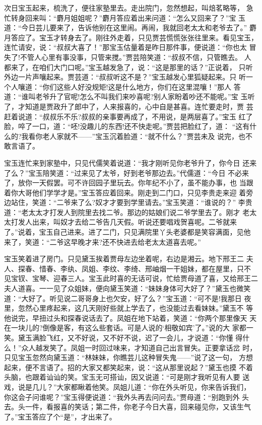 次日宝玉起来，梳洗了，便往家塾里去。走出院门，忽然想起，叫焙茗略等，
急忙转身回来叫：“麝月姐姐呢？”麝月答应着出来问道：“怎么又回来了？”宝
玉道：“今日芸儿要来了，告诉他别在这里闹。再闹，我就回老太太和老爷去了。”
麝月答应了。宝玉才转身去了。刚往外走着，只见贾芸慌慌张张往里来。看见宝玉，
连忙请安，说：“叔叔大喜了！”那宝玉估量着是昨日那件事，便说道：“你也太
冒失了!不管人心里有事没事，只管来搅。”贾芸陪笑道：“叔叔不信，只管瞧去。
人都来了，在咱们大门口呢。”宝玉越发急了，说：“这是那里的话？”正说着，
只听外边一片声嚷起来。贾芸道：“叔叔听这不是？”宝玉越发心里狐疑起来。只
听一个人嚷道：“你们这些人好没规矩!这是什么地方，你们在这里混嚷！”那人
答道：“谁叫老爷升了官呢!怎么不叫我们来吵喜呢?别人家盼着吵还不能呢。”宝
玉听了，才知道是贾政升了郎中了，人来报喜的，心中自是甚喜。连忙要走时，贾
芸赶着说道：“叔叔乐不乐?叔叔的亲事要再成了，不用说，是两层喜了。”宝玉
红了脸，啐了一口，道：“呸!没趣儿的东西!还不快走呢。”贾芸把脸红了，道：
“这有什么的?我看你老人家就不——”宝玉沉着脸道：“就不什么？”贾芸未及
说完，也不敢言语了。

宝玉连忙来到家塾中，只见代儒笑着说道：“我才刚听见你老爷升了，你今日
还来了么？”宝玉陪笑道：“过来见了太爷，好到老爷那边去。”代儒道：“今日
不必来了，放你一天假罢。可不许回园子里玩去。你年纪不小了，虽不能办事，也
当跟着你大哥他们学学才是。”宝玉答应着回来。刚走到二门口，只见李贵走来迎
着旁边站住，笑道：“二爷来了么?奴才才要到学里请去。”宝玉笑道：“谁说的？”
李贵道：“老太太才打发人到院里去找二爷。那边的姑娘们说二爷学里去了。刚才
老太太打发人出来，叫奴才去给二爷告几天假。听说还要唱戏贺喜呢。二爷就来
了。”说着，宝玉自己进来。进了二门，只见满院里丫头老婆都是笑容满面，见他
来了，笑道：“二爷这早晚才来?还不快进去给老太太道喜去呢。”

宝玉笑着进了房门。只见黛玉挨着贾母左边坐着呢，右边是湘云。地下邢王二
夫人、探春、惜春、李纨、凤姐、李纹、李绮、邢岫烟一干姐妹，都在屋里，只不
见宝钗、宝琴、迎春三人。宝玉此时喜的无话可说，忙给贾母道了喜，又给邢王二
夫人道喜。一一见了众姐妹，便向黛玉笑道：“妹妹身体可大好了？”黛玉也微笑
道：“大好了。听见说二哥哥身上也欠安，好了么？”宝玉道：“可不是!我那日
夜里，忽然心里疼起来，这几天刚好些就上学去了，也没能过去看妹妹。”黛玉不
等他说完，早扭过头和探春说话去了。凤姐在地下站着，笑道：“你两个那里像天
天在一块儿的?倒像是客，有这么些套话。可是人说的‘相敬如宾’了。”说的大
家都一笑。黛玉满脸飞红，又不好说，又不好不说，迟了一会儿，才说道：“你懂
得什么！”众人越发笑了。凤姐一时回过味来，才知道自己出言冒失。正要拿话岔
时，只见宝玉忽然向黛玉道：“林妹妹，你瞧芸儿这种冒失鬼——”说了这一句，
方想起来，便不言语了。招的大家又都笑起来，说：“这从那里说起？”黛玉也摸
不着头脑，也跟着讪讪的笑。宝玉无可搭讪，因又说道：“可是刚才我听见有人要
送戏，说是几儿？”大家都瞅着他笑。凤姐儿道：“你在外头听见，你来告诉我们，
你这会子问谁呢？”宝玉得便说道：“我外头再去问问去。”贾母道：“别跑到外
头去。头一件，看报喜的笑话；第二件，你老子今日大喜，回来碰见你，又该生气
了。”宝玉答应了个“是”，才出来了。

